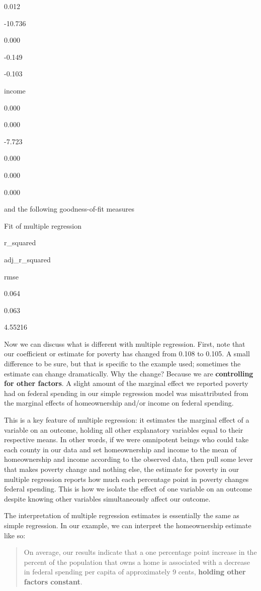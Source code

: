 \documentclass[
]{book}
\begin{document}
0.012

-10.736

0.000

-0.149

-0.103

income

0.000

0.000

-7.723

0.000

0.000

0.000

and the following goodness-of-fit measures

\label{tab:multregexfit}Fit of multiple regression

r\_squared

adj\_r\_squared

rmse

0.064

0.063

4.55216

Now we can discuss what is different with multiple regression. First, note that our coefficient or estimate for poverty has changed from 0.108 to 0.105. A small difference to be sure, but that is specific to the example used; sometimes the estimate can change dramatically. Why the change? Because we are \textbf{controlling for other factors}. A slight amount of the marginal effect we reported poverty had on federal spending in our simple regression model was misattributed from the marginal effects of homeownership and/or income on federal spending.

This is a key feature of multiple regression: it estimates the marginal effect of a variable on an outcome, holding all other explanatory variables equal to their respective means. In other words, if we were omnipotent beings who could take each county in our data and set homeownership and income to the mean of homeownership and income according to the observed data, then pull some lever that makes poverty change and nothing else, the estimate for poverty in our multiple regression reports how much each percentage point in poverty changes federal spending. This is how we isolate the effect of one variable on an outcome despite knowing other variables simultaneously affect our outcome.

The interpretation of multiple regression estimates is essentially the same as simple regression. In our example, we can interpret the homeownership estimate like so:

\begin{quote}
On average, our results indicate that a one percentage point increase in the percent of the population that owns a home is associated with a decrease in federal spending per capita of approximately 9 cents, \textbf{holding other factors constant}.
\end{quote}
\end{document}
